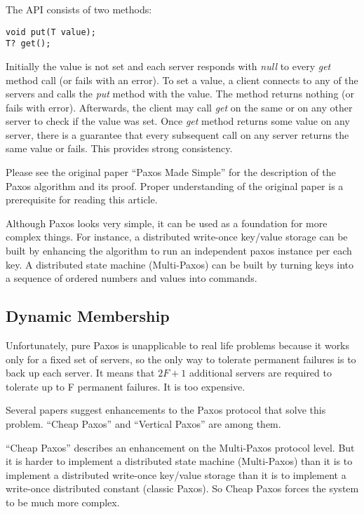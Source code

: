 \documentclass[12pt]{article}
\begin{document}
The API consists of two methods:
\begin{lstlisting}[frame=single]
void put(T value);
T? get();
\end{lstlisting}

Initially the value is not set and each server responds with {\it null} to every {\it get} method call (or fails with an error). To set a value, a client connects to any of the servers and calls the {\it put} method with the value. The method returns nothing (or fails with error). Afterwards, the client may call {\it get} on the same or on any other server to check if the value was set. Once {\it get} method returns some value on any server, there is a guarantee that every subsequent call on any server returns the same value or fails. This provides strong consistency.

Please see the original paper ``Paxos Made Simple'' \cite{lamport01} for the description of the Paxos algorithm and its proof. Proper understanding of the original paper is a prerequisite for reading this article.

Although Paxos looks very simple, it can be used as a foundation for more complex things. For instance, a distributed write-once key/value storage can be built by enhancing the algorithm to run an independent paxos instance per each key. A distributed state machine (Multi-Paxos) can be built by turning keys into a sequence of ordered numbers and values into commands.

\subsection{Dynamic Membership}

Unfortunately, pure Paxos is unapplicable to real life problems because it works only for a fixed set of servers, so the only way to tolerate permanent failures is to back up each server. It means that $2F+1$ additional servers are required to tolerate up to F permanent failures. It is too expensive.

Several papers suggest enhancements to the Paxos protocol that solve this problem. ``Cheap Paxos'' \cite{lamport03} and ``Vertical Paxos'' \cite{lamport09} are among them.

\medskip

``Cheap Paxos'' describes an enhancement on the Multi-Paxos protocol level. But it is harder to implement a distributed state machine (Multi-Paxos) than it is to implement a distributed write-once key/value storage than it is to implement a write-once distributed constant (classic Paxos). So Cheap Paxos forces the system to be much more complex.
\end{document}
